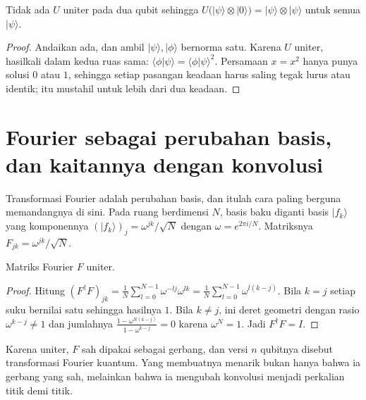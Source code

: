 \begin{proposisi}
Tidak ada $U$ uniter pada dua qubit sehingga
$U\bigl(|\psi\rangle\otimes|0\rangle\bigr)=|\psi\rangle\otimes|\psi\rangle$ untuk semua
$|\psi\rangle$.
\end{proposisi}

\begin{proof}
Andaikan ada, dan ambil $|\psi\rangle,|\phi\rangle$ bernorma satu. Karena $U$ uniter,
hasilkali dalam kedua ruas sama: $\langle\phi|\psi\rangle=\langle\phi|\psi\rangle^2$.
Persamaan $x=x^2$ hanya punya solusi $0$ atau $1$, sehingga setiap pasangan keadaan
harus saling tegak lurus atau identik; itu mustahil untuk lebih dari dua keadaan.
\end{proof}


\section{Fourier sebagai perubahan basis, dan kaitannya dengan konvolusi}

Transformasi Fourier adalah perubahan basis, dan itulah cara paling berguna
memandangnya di sini. Pada ruang berdimensi $N$, basis baku diganti basis $|f_k\rangle$
yang komponennya $(|f_k\rangle)_j=\omega^{jk}/\sqrt{N}$ dengan $\omega=e^{2\pi i/N}$.
Matriksnya $F_{jk}=\omega^{jk}/\sqrt{N}$.

\begin{proposisi}
Matriks Fourier $F$ uniter.
\end{proposisi}

\begin{proof}
Hitung $(F^{\dagger}F)_{jk}=\frac{1}{N}\sum_{l=0}^{N-1}\omega^{-lj}\omega^{lk}
=\frac{1}{N}\sum_{l=0}^{N-1}\omega^{l(k-j)}$. Bila $k=j$ setiap suku bernilai satu
sehingga hasilnya $1$. Bila $k\neq j$, ini deret geometri dengan rasio
$\omega^{k-j}\neq1$ dan jumlahnya $\frac{1-\omega^{N(k-j)}}{1-\omega^{k-j}}=0$ karena
$\omega^{N}=1$. Jadi $F^{\dagger}F=I$.
\end{proof}

Karena uniter, $F$ sah dipakai sebagai gerbang, dan versi $n$ qubitnya disebut
transformasi Fourier kuantum. Yang membuatnya menarik bukan hanya bahwa ia gerbang yang
sah, melainkan bahwa ia mengubah konvolusi menjadi perkalian titik demi titik.

